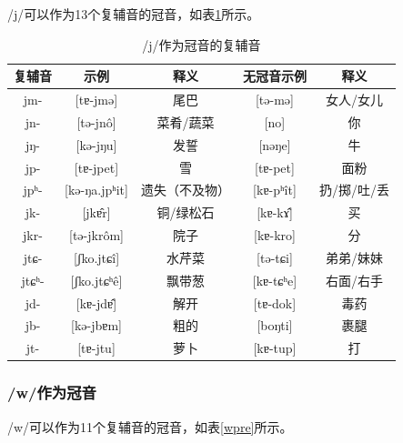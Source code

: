 /j/可以作为13个复辅音的冠音，如表\ref{jpre}所示。

\begin{table}[H]
\vspace{5pt}
    \centering
    \caption{/j/作为冠音的复辅音}
    \label{jpre}
\begin{tabular}{c|cccc}
     \toprule
复辅音   & 示例              & 释义   & 无冠音示例          & 释义        \\
     \midrule
	jm-   & {[}tɐ-jmə{]}      & 尾巴      & {[}tə-mə{]}    & 女人/女儿   \\
jn-   & {[}tə-jnô{]}     & 菜肴/蔬菜   & {[}no{]}       & 你       \\
jŋ-   & {[}kə-jŋu{]}      & 发誓      & {[}nəŋe{]}     & 牛       \\
jp-   & {[}tɐ-jpet{]}     & 雪       & {[}tɐ-pet{]}   & 面粉      \\
jpʰ-  & {[}kə-ŋa.jpʰit{]} & 遗失（不及物） & {[}kɐ-pʰît{]} & 扔/掷/吐/丢 \\
jk-   & {[}jkɐ̂r{]}       & 铜/绿松石   & {[}kɐ-kɤ̂{]}   & 买       \\
jkr-  & {[}tə-jkrôm{]}   & 院子      & {[}kɐ-kro{]}   & 分       \\
jtɕ-  & {[}ʃko.jtɕî{]}   & 水芹菜     & {[}tə-tɕi{]}   & 弟弟/妹妹   \\
jtɕʰ- & {[}ʃko.jtɕʰê{]}  & 飘带葱     & {[}kɐ-tɕʰe{]}  & 右面/右手   \\
jd-   & {[}kɐ-jdɐ̂{]}     & 解开      & {[}tɐ-dok{]}   & 毒药      \\
jb-   & {[}kə-jbɐm{]}     & 粗的      & {[}boŋti{]}    & 裹腿      \\
jt-   & {[}tɐ-jtu{]}      & 萝卜      & {[}kɐ-tup{]}   & 打      \\
   \bottomrule
\end{tabular}
\end{table}

\subsubsection{/w/作为冠音}

/w/可以作为11个复辅音的冠音，如表\ref{wpre}所示。

